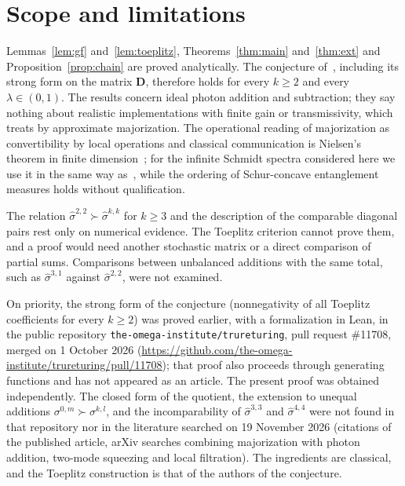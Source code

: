 \documentclass[11pt,a4paper]{article}
\theoremstyle{definition}
\theoremstyle{plain}
\newcommand{\sig}[2]{\hat\sigma^{#1,#2}}
\begin{document}
\section{Scope and limitations}\label{sec:scope}
Lemmas~\ref{lem:gf} and~\ref{lem:toeplitz}, Theorems~\ref{thm:main}
and~\ref{thm:ext} and Proposition~\ref{prop:chain} are proved analytically.
The conjecture of~\cite{VanHerstraeten2024}, including its strong form on the
matrix $\mathbf D$, therefore holds for every $k\ge2$ and every
$\lambda\in(0,1)$. The results concern ideal photon addition and subtraction;
they say nothing about realistic implementations with finite gain or
transmissivity, which~\cite{VanHerstraeten2024} treats by approximate
majorization. The operational reading of majorization as convertibility by
local operations and classical communication is Nielsen's theorem in finite
dimension~\cite{Nielsen1999}; for the infinite Schmidt spectra considered here
we use it in the same way as~\cite{VanHerstraeten2024}, while the ordering of
Schur-concave entanglement measures holds without qualification.

The relation $\sig22\succ\sig kk$ for $k\ge3$ and the description of the
comparable diagonal pairs rest only on numerical evidence. The Toeplitz
criterion cannot prove them, and a proof would need another stochastic matrix
or a direct comparison of partial sums. Comparisons between unbalanced
additions with the same total, such as $\sig31$ against $\sig22$, were not
examined.

On priority, the strong form of the conjecture (nonnegativity of all
Toeplitz coefficients for every $k\ge2$) was proved earlier, with a
formalization in Lean, in the public repository
\texttt{the-omega-institute/trureturing}, pull request \#11708, merged on
1 October 2026
(\url{https://github.com/the-omega-institute/trureturing/pull/11708}); that
proof also proceeds through generating functions and has not appeared as an
article. The present proof was obtained independently. The closed form of the
quotient, the extension to unequal additions $\sigma^{0,m}\succ\sigma^{k,l}$,
and the incomparability of $\sig33$ and $\sig44$ were not found in that
repository nor in the literature searched on 19 November 2026 (citations of
the published article, arXiv searches combining majorization with photon
addition, two-mode squeezing and local filtration). The ingredients are
classical, and the Toeplitz construction is that of the authors of the
conjecture.
\end{document}
